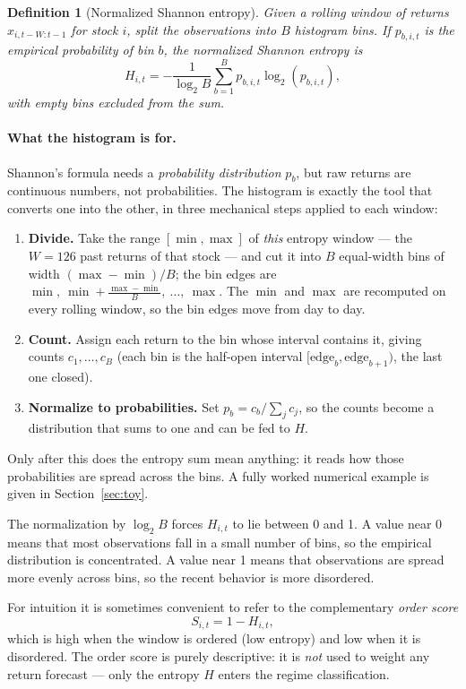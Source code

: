 \documentclass[a4paper,12pt]{article}
\newtheorem{definition}{Definition}[section]
\begin{document}
\begin{definition}[Normalized Shannon entropy]
Given a rolling window of returns $x_{i,t-W:t-1}$ for stock $i$, split the observations into $B$ histogram bins. If $p_{b,i,t}$ is the empirical probability of bin $b$, the normalized Shannon entropy is
\[
H_{i,t}=
-\frac{1}{\log_2 B}
\sum_{b=1}^{B}p_{b,i,t}\log_2(p_{b,i,t}),
\]
with empty bins excluded from the sum.
\end{definition}

\paragraph{What the histogram is for.} Shannon's formula needs a \emph{probability distribution} $p_b$, but raw returns are continuous numbers, not probabilities. The histogram is exactly the tool that converts one into the other, in three mechanical steps applied to each window:
\begin{enumerate}[label=(\roman*),leftmargin=*]
    \item \textbf{Divide.} Take the range $[\min,\max]$ of \emph{this} entropy window --- the $W=126$ past returns of that stock --- and cut it into $B$ equal-width bins of width $(\max-\min)/B$; the bin edges are $\min,\ \min+\tfrac{\max-\min}{B},\ \ldots,\ \max$. The $\min$ and $\max$ are recomputed on every rolling window, so the bin edges move from day to day.
    \item \textbf{Count.} Assign each return to the bin whose interval contains it, giving counts $c_1,\ldots,c_B$ (each bin is the half-open interval $[\text{edge}_b,\text{edge}_{b+1})$, the last one closed).
    \item \textbf{Normalize to probabilities.} Set $p_b=c_b/\sum_j c_j$, so the counts become a distribution that sums to one and can be fed to $H$.
\end{enumerate}
Only after this does the entropy sum mean anything: it reads how those probabilities are spread across the bins. A fully worked numerical example is given in Section~\ref{sec:toy}.

The normalization by $\log_2 B$ forces $H_{i,t}$ to lie between 0 and 1. A value near 0 means that most observations fall in a small number of bins, so the empirical distribution is concentrated. A value near 1 means that observations are spread more evenly across bins, so the recent behavior is more disordered.

For intuition it is sometimes convenient to refer to the complementary \emph{order score}
\[
S_{i,t}=1-H_{i,t},
\]
which is high when the window is ordered (low entropy) and low when it is disordered. The order score is purely descriptive: it is \emph{not} used to weight any return forecast --- only the entropy $H$ enters the regime classification.
\end{document}
